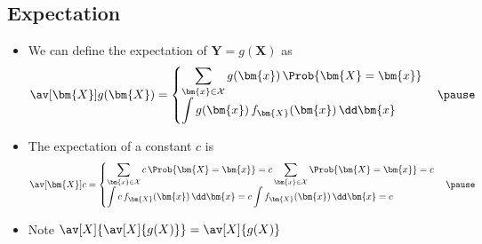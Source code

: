 \begin{slide}
\section[-2]{Expectation}

\begin{PauseHighLight}
  \begin{itemize}
  \item We can define the expectation of $\bm{Y}=g(\bm{X})$ as
    \begin{align*}
      \av[\bm{X}]{g(\bm{X})} =
      \begin{cases}
        \displaystyle \sum_{\bm{x}\in\mathcal{X}} g(\bm{x})\, \Prob{\bm{X}=\bm{x}} \\
        \displaystyle \int g(\bm{x})\, f_{\bm{X}}(\bm{x}) \, \dd \bm{x}
      \end{cases}\pause
    \end{align*}
  \item The expectation of a constant $c$ is
        \begin{align*}
      \av[\bm{X}]{c} =
      \begin{cases}
        \displaystyle \sum_{\bm{x}\in\mathcal{X}} c\,
        \Prob{\bm{X}=\bm{x}}
        = c \sum_{\bm{x}\in\mathcal{X}}  \Prob{\bm{X}=\bm{x}}
        = c \\
        \displaystyle \int c\, f_{\bm{X}}(\bm{x}) \, \dd \bm{x}
        = c \int  f_{\bm{X}}(\bm{x}) \, \dd \bm{x} =c 
      \end{cases}\pause
    \end{align*}
  \item Note $\av[X]{\av[X]{g(X)}} = \av[X]{g(X)}$\pause

  \end{itemize}
\end{PauseHighLight}

\end{slide}

